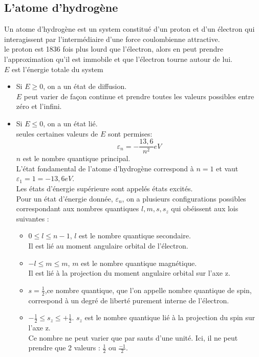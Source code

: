 \documentclass[12pt,oneside]{book}
\begin{document}
\subsection{L'atome d'hydrogène}
Un atome d'hydrogène est un system constitué d'un proton et d'un électron qui interagissent par l'intermédiaire d'une force coulombienne attractive.\\
le proton est 1836 fois plus lourd que l'électron, alors en peut prendre l'approximation qu'il est immobile et que l'électron tourne autour de lui.\\
$E$ est l'énergie totale du system
\begin{itemize}
	\item Si $E \geq 0$, on a un  état de diffusion.\\
	      $E$ peut varier de façon continue et prendre toutes les valeurs possibles entre zéro et l'infini.
	\item Si $E \leq 0$, on a un état lié.\\
	      seules certaines valeurs de $E$ sont permises:
	      \[ \varepsilon_n = -\frac{13,6}{n^2}eV \]
	      $n$ est le nombre quantique principal.\\
	      L'état fondamental de l'atome d'hydrogène correspond à $n = 1$ et vaut $\varepsilon_1 =1 = -13, 6 eV$.\\
	      Les états d'énergie supérieure sont appelés états excités.\\
	      Pour un état d'énergie donnée, $\varepsilon_n$, on a plusieurs configurations possibles correspondant aux nombres quantiques $l, m, s, s_z$ qui obéissent aux lois suivantes :
	      \begin{itemize}
		      \item $ 0 \leq l \leq n-1$, $l$ est le nombre quantique secondaire.\\
		            Il est lié au moment angulaire orbital de l'électron.
		      \item $-l \leq m \leq m$, $m$ est le nombre quantique magnétique.\\
		            Il est lié à la projection du moment angulaire orbital sur l'axe z.
		      \item $s = \frac{1}{2}$,ce nombre quantique, que l'on appelle nombre quantique de spin, correspond à un degré de liberté purement interne de l'électron.
		      \item $- \frac{1}{2}\leq s_z \leq + \frac{1}{2}$. $s_z$ est le nombre quantique lié à la projection du spin sur l'axe z.\\
		            Ce nombre ne peut varier que par sauts d'une unité. Ici, il ne peut prendre que 2 valeurs : $\frac{1}{2}$ ou $\frac{-1}{2}$.

\end{itemize}
\end{itemize}
\end{document}
